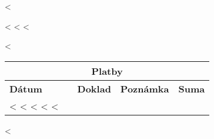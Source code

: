 \documentclass{scrartcl}
\begin{document}
\vspace{0.3cm}

<%

<%
\vspace{0.3cm}
<%
<%

\vspace{0.3cm}

<%
\begin{tabular}{@{}llllr@{}}
  \multicolumn{5}{c}{\textbf{Platby}} \\
  \hline
  \textbf{Dátum} & & \textbf{Doklad} & \textbf{Poznámka} & \textbf{Suma} \\
<%
<%
  <%
<%
<%
\end{tabular}
<%
\end{document}
